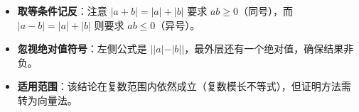 \begin{trapbox}
\begin{itemize}
    \item \textbf{取等条件记反}：注意 $|a+b| = |a| + |b|$ 要求 $ab \geqslant 0$（同号），而 $|a-b| = |a| + |b|$ 则要求 $ab \leqslant 0$（异号）。
    \item \textbf{忽视绝对值符号}：左侧公式是 $||a|-|b||$，最外层还有一个绝对值，确保结果非负。
    \item \textbf{适用范围}：该结论在复数范围内依然成立（复数模长不等式），但证明方法需转为向量法。
\end{itemize}
\end{trapbox}